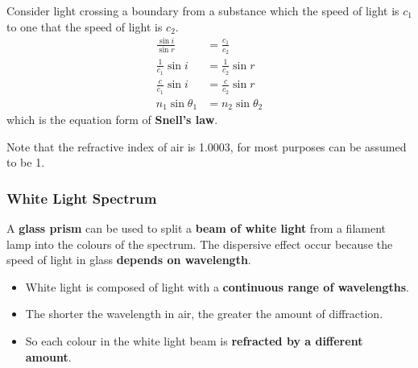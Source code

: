 Consider light crossing a boundary from a substance which the speed of light is $c_1$ to one that the speed of light is $c_2$.
\begin{align*}
    \frac{\sin i}{\sin r}&=\frac{c_1}{c_2}\\
    \frac{1}{c_1}\sin i&=\frac{1}{c_2}\sin r\\
    \frac{c}{c_1}\sin i&=\frac{c}{c_2}\sin r\\
    n_1\sin\theta_1&=n_2\sin\theta_2
\end{align*}
which is the equation form of \textbf{Snell's law}.

Note that the refractive index of air is 1.0003, for most purposes can be assumed to be 1.

\subsubsection*{White Light Spectrum}

A \textbf{glass prism} can be used to split a \textbf{beam of white light} from a filament lamp into the colours of the spectrum. The dispersive effect occur because the speed of light in glass \textbf{depends on wavelength}.
\begin{itemize}
    \item White light is composed of light with a \textbf{continuous range of wavelengths}.
    \item The shorter the wavelength in air, the greater the amount of diffraction.
    \item So each colour in the white light beam is \textbf{refracted by a different amount}.
\end{itemize}
